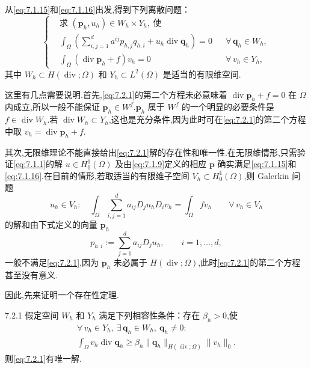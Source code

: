从\eqref{eq:7.1.15}和\eqref{eq:7.1.16}出发,得到下列离散问题：
\begin{equation}\label{eq:7.2.1}
  \left\{
  \begin{aligned}
    &\text{求 }(\boldsymbol{p}_h,u_h)\in W_h\times Y_h,\ \text{使}\\
    &\int_\Omega\left(\sum_{i,j=1}^d a^{ij}p_{h,j}q_{h,i}
          +u_h\operatorname{div}\boldsymbol{q}_h\right)=0
       &&\forall\,\boldsymbol{q}_h\in W_h,\\
    &\int_\Omega(\operatorname{div}\boldsymbol{p}_h+f)v_h=0
       &&\forall\,v_h\in Y_h,
  \end{aligned}
  \right.
\end{equation}
其中 \(W_h\subset H(\operatorname{div};\Omega)\) 和 \(Y_h\subset L^2(\Omega)\) 是适当的有限维空间.

这里有几点需要说明.首先,\eqref{eq:7.2.1}的第二个方程未必意味着 \(\operatorname{div}\boldsymbol{p}_h+f=0\) 在 \(\Omega\) 内成立,所以一般不能保证 \(\boldsymbol{p}_h\in W^f\).\(\boldsymbol{p}_h\) 属于 \(W^f\) 的一个明显的必要条件是 \(f\in\operatorname{div}W_h\).若 \(\operatorname{div}W_h\subset Y_h\),这也是充分条件,因为此时可在\eqref{eq:7.2.1}的第二个方程中取 \(v_h=\operatorname{div}\boldsymbol{p}_h+f\).

其次,无限维理论不能直接给出\eqref{eq:7.2.1}解的存在性和唯一性.在无限维情形,只需验证\eqref{eq:7.1.1}的解 \(u\in H_0^1(\Omega)\) 及由\eqref{eq:7.1.9}定义的相应 \(\boldsymbol{p}\) 确实满足\eqref{eq:7.1.15}和\eqref{eq:7.1.16}.在目前的情形,若取适当的有限维子空间 \(V_h\subset H_0^1(\Omega)\),则 Galerkin 问题
\begin{equation}\label{eq:7.2.2}
  u_h\in V_h:\quad
    \int_\Omega\sum_{i,j=1}^d a_{ij}D_ju_hD_iv_h
       =\int_\Omega fv_h\qquad\forall\,v_h\in V_h
\end{equation}
的解和由下式定义的向量 \(\boldsymbol{p}_h\)
\begin{equation}\label{eq:7.2.3}
  p_{h,i}:=\sum_{j=1}^d a_{ij}D_ju_h,\qquad i=1,\ldots,d,
\end{equation}
一般不满足\eqref{eq:7.2.1},因为 \(\boldsymbol{p}_h\) 未必属于 \(H(\operatorname{div};\Omega)\),此时\eqref{eq:7.2.1}的第二个方程甚至没有意义.

因此,先来证明一个存在性定理.

\begin{theorem}[]{7.2.1}
假定空间 \(W_h\) 和 \(Y_h\) 满足下列相容性条件：存在 \(\beta_h>0\),使
\begin{equation}\label{eq:7.2.4}
  \begin{gathered}
    \forall\,v_h\in Y_h,\ \exists\,\boldsymbol{q}_h\in W_h,\ \boldsymbol{q}_h\ne0:\qquad\\
    \int_\Omega v_h\operatorname{div}\boldsymbol{q}_h
      \ge\beta_h\|\boldsymbol{q}_h\|_{H(\operatorname{div};\Omega)}\|v_h\|_0.
  \end{gathered}
\end{equation}
则\eqref{eq:7.2.1}有唯一解.
\end{theorem}

